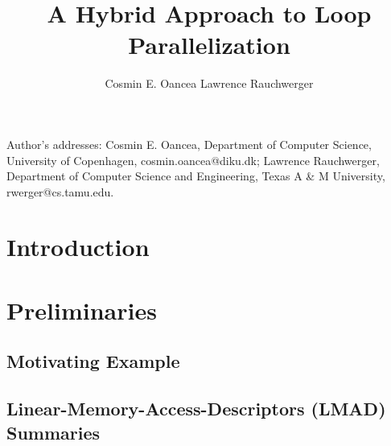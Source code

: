 \documentclass[prodmode,acmtecs]{acmsmall}
\begin{document}

\title{A Hybrid Approach to Loop Parallelization}
\author{Cosmin E. Oancea
Lawrence Rauchwerger
}


\begin{abstract}

\end{abstract}







\begin{bottomstuff}
Author's addresses: 
Cosmin E. Oancea, Department of Computer Science,
University of Copenhagen, cosmin.oancea@diku.dk; 
Lawrence Rauchwerger, Department of Computer Science and Engineering,
Texas A \& M University, rwerger@cs.tamu.edu.
\end{bottomstuff}

\maketitle


\section{Introduction}


\section{Preliminaries}

\subsection{Motivating Example}

\subsection{Linear-Memory-Access-Descriptors (LMAD) Summaries}
\end{document}
